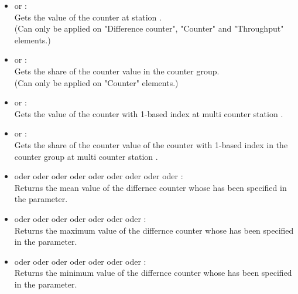 \begin{itemize}

\item
{} or :\\
Gets the value of the counter at station .\\
(Can only be applied on "Difference counter", "Counter" and "Throughput" elements.)

\item
{} or :\\
Gets the share of the counter value in the counter group.\\
(Can only be applied on "Counter" elements.)

\item
{} or :\\
Gets the value of the counter with 1-based index  at multi counter station .

\item
{} or :\\
Gets the share of the counter value of the counter with 1-based index  in the counter group at multi counter station .

\item
{} oder  oder  oder  oder  oder  oder  oder  oder  oder :\\
Returns the mean value of the differnce counter whose  has been specified in the parameter.

\item
{} oder  oder  oder  oder  oder  oder  oder :\\
Returns the maximum value of the differnce counter whose  has been specified in the parameter.

\item
{} oder  oder  oder  oder  oder  oder  oder :\\
Returns the minimum value of the differnce counter whose  has been specified in the parameter.


\end{itemize}
